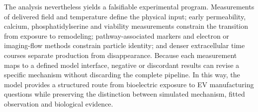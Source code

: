 The analysis nevertheless yields a falsifiable experimental program. Measurements of delivered field and temperature define the physical input; early permeability, calcium, phosphatidylserine and viability measurements constrain the transition from exposure to remodeling; pathway-associated markers and electron or imaging-flow methods constrain particle identity; and denser extracellular time courses separate production from disappearance. Because each measurement maps to a defined model interface, negative or discordant results can revise a specific mechanism without discarding the complete pipeline. In this way, the model provides a structured route from bioelectric exposure to EV manufacturing questions while preserving the distinction between simulated mechanism, fitted observation and biological evidence.
